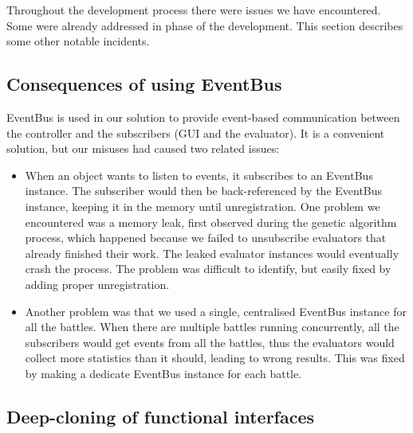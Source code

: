 Throughout the development process there were issues we have encountered. Some were already addressed in phase  of the development. This section describes some other notable incidents.

\subsection{Consequences of using EventBus}

EventBus is used in our solution to provide event-based communication between the controller and the subscribers (GUI and the evaluator). It is a convenient solution, but our misuses had caused two related issues:
\begin{itemize}
	\item When an object wants to listen to events, it subscribes to an EventBus instance. The subscriber would then be back-referenced by the EventBus instance, keeping it in the memory until unregistration. One problem we encountered was a memory leak, first observed during the genetic algorithm process, which happened because we failed to unsubscribe evaluators that already finished their work. The leaked evaluator instances would eventually crash the process. The problem was difficult to identify, but easily fixed by adding proper unregistration.
	\item Another problem was that we used a single, centralised EventBus instance for all the battles. When there are multiple battles running concurrently, all the subscribers would get events from all the battles, thus the evaluators would collect more statistics than it should, leading to wrong results. This was fixed by making a dedicate EventBus instance for each battle.
\end{itemize}

\subsection{Deep-cloning of functional interfaces}

